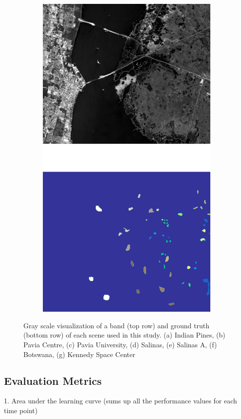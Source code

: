 \documentclass[parskip=full]{scrartcl}
\begin{document}
\begin{figure}[H]
\begin{subfigure}{.24\textwidth}
		\includegraphics[height=1.5\linewidth]{../analysis/kennedy_space_center}
		\subcaption{{\medbreak}}\label{fig:kennedy_space_center}
	\end{subfigure}
	\caption{Gray scale visualization of a band (top row) and ground truth (bottom row) of
		each scene used in this study. (a) Indian Pines, (b) Pavia Centre, (c) Pavia
		University, (d) Salinas, (e) Salinas A, (f) Botswana, (g) Kennedy Space Center
    }\label{fig:scenes}
\end{figure}

\subsection{Evaluation Metrics}

1. Area under the learning curve (sums up all the performance values for each time point)
\end{document}
